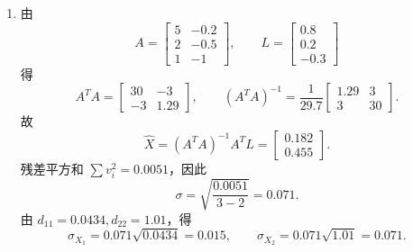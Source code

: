 \documentclass[UTF8,12pt,a4paper]{ctexart}
\begin{document}
\begin{enumerate}[label=\arabic*、]
\newpage

\item 由
\begin{equation*}
A=\begin{bmatrix}5&-0.2\\2&-0.5\\1&-1\end{bmatrix},\qquad
L=\begin{bmatrix}0.8\\0.2\\-0.3\end{bmatrix}
\end{equation*}
得
\begin{equation*}
A^TA=\begin{bmatrix}30&-3\\-3&1.29\end{bmatrix},
\qquad (A^TA)^{-1}=\frac{1}{29.7}\begin{bmatrix}1.29&3\\3&30\end{bmatrix}.
\end{equation*}
故
\begin{equation*}
    \hat{X}=(A^TA)^{-1}A^TL=\begin{bmatrix}0.182\\0.455\end{bmatrix}.
\end{equation*}
残差平方和 $\sum v_i^2=0.0051$，因此
\begin{equation*}
    \sigma=\sqrt{\frac{0.0051}{3-2}}=0.071.
\end{equation*}
由 $d_{11}=0.0434,d_{22}=1.01$，得
\begin{equation*}
    \sigma_{X_1}=0.071\sqrt{0.0434}=0.015,
    \qquad
    \sigma_{X_2}=0.071\sqrt{1.01}=0.071.
\end{equation*}

\newpage


\end{enumerate}
\end{document}
